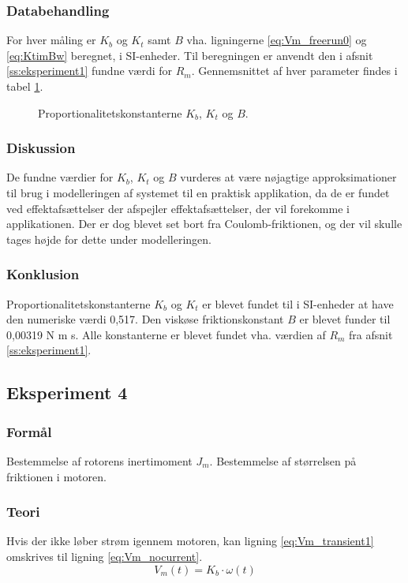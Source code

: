 \subsubsection{Databehandling}
For hver måling er $K_b$ og $K_t$ samt $B$ vha. ligningerne \ref{eq:Vm_freerun0} og \ref{eq:KtimBw} beregnet,
i SI-enheder. Til beregningen er anvendt den i afsnit \ref{ss:eksperiment1} fundne værdi for $R_m$.
Gennemsnittet af hver parameter findes i tabel \ref{tb:kbktb}.
\begin{figure}[th!]
	\centering
	
	\captionsetup{type=table}
	\caption[Proportionalitetskonstanterne $K_b$, $K_t$ og $B$]
			{Proportionalitetskonstanterne $K_b$, $K_t$ og $B$.}
	\label{tb:kbktb}
\end{figure}

\subsubsection{Diskussion}
De fundne værdier for $K_b$, $K_t$ og $B$ vurderes at være nøjagtige approksimationer
til brug i modelleringen af systemet til en praktisk applikation, da de er fundet ved effektafsættelser
der afspejler effektafsættelser, der vil forekomme i applikationen.
Der er dog blevet set bort fra Coulomb-friktionen, og der vil skulle tages højde for dette under modelleringen.
\subsubsection{Konklusion}
Proportionalitetskonstanterne $K_b$ og $K_t$ er blevet fundet til i SI-enheder at have den numeriske værdi 0,517.
Den viskøse friktionskonstant $B$ er blevet funder til 0,00319 N m s.
Alle konstanterne er blevet fundet vha. værdien af $R_m$ fra afsnit \ref{ss:eksperiment1}.
\subsection{Eksperiment 4}
\subsubsection{Formål}
Bestemmelse af rotorens inertimoment $J_m$.
Bestemmelse af størrelsen på friktionen i motoren.
\subsubsection{Teori}
Hvis der ikke løber strøm igennem motoren,
kan ligning \ref{eq:Vm_transient1} omskrives til ligning \ref{eq:Vm_nocurrent}.
\begin{equation}
	V_m(t)=K_b\cdot\omega(t)
	\label{eq:Vm_nocurrent}
 \end{equation}

